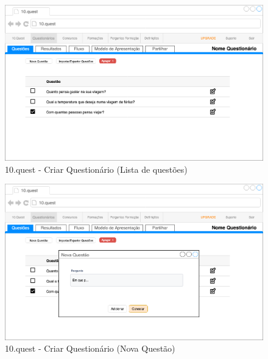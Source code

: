 \begin{figure}[ht!]
	\begin{center}
		\includegraphics[width=1\textwidth]{img/prototipos/13.png}
		\caption{10.quest - Criar Questionário (Lista de questões)}
		\label{10q-}
	\end{center}
\end{figure}

\begin{figure}[ht!]
	\begin{center}
		\includegraphics[width=1\textwidth]{img/prototipos/14.png}
		\caption{10.quest - Criar Questionário (Nova Questão) }
		\label{10q-}
	\end{center}
\end{figure}

